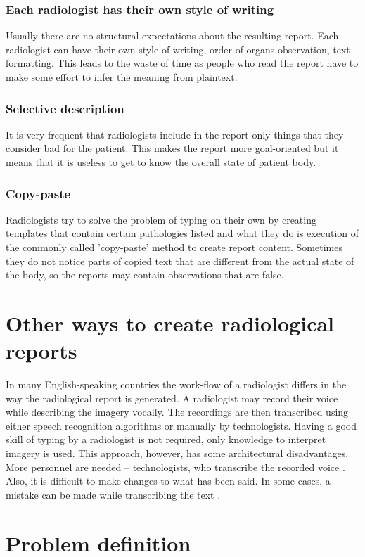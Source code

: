 \documentclass[12pt, twoside, openany]{report}
\theoremstyle{definition}
\begin{document}
\subsubsection{Each radiologist has their own style of writing}
Usually there are no structural expectations about the resulting report. Each radiologist can have their own style of writing, order of organs observation, text formatting. This leads to the waste of time as people who read the report have to make some effort to infer the meaning from plaintext. 
\subsubsection{Selective description}
It is very frequent that radiologists include in the report only things that they consider bad for the patient. This makes the report more goal-oriented but it means that it is useless to get to know the overall state of patient body.
\subsubsection{Copy-paste}
Radiologists try to solve the problem of typing on their own by creating templates that contain certain pathologies listed and what they do is execution of the commonly called 'copy-paste' method to create report content. Sometimes they do not notice parts of copied text that are different from the actual state of the body, so the reports may contain observations that are false. 

\section{Other ways to create radiological reports}
In many English-speaking countries the work-flow of a radiologist differs in the way the radiological report is generated. A radiologist may record their voice while describing the imagery vocally. The recordings are then transcribed using either speech recognition algorithms or manually by technologists. Having a good skill of typing by a radiologist is not required, only knowledge to interpret imagery is used. This approach, however, has some architectural disadvantages. More personnel are needed -- technologists, who transcribe the recorded voice \cite{speech-impact}. Also, it is difficult to make changes to what has been said. In some cases, a mistake can be made while transcribing the text \cite{speech-africa}.

\section{Problem definition}
\end{document}
